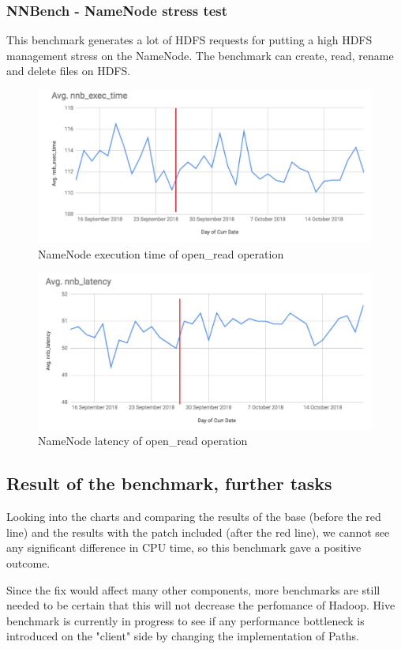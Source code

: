 \subsubsection{NNBench - NameNode stress test}
This benchmark generates a lot of HDFS requests for putting a high HDFS management stress on the NameNode. The benchmark can create, read, rename and delete files on HDFS.

\begin{figure}[H]
	\includegraphics[width=125mm, keepaspectratio]{figures/nn_exec.png}
	\centering
	\caption{NameNode execution time of open\_read operation}
\end{figure}
\begin{figure}[H]
	\includegraphics[width=125mm, keepaspectratio]{figures/nn_latency.png}
	\centering
	\caption{NameNode latency of open\_read operation}
\end{figure}

\subsection{Result of the benchmark, further tasks }
Looking into the charts and comparing the results of the base (before the red line) and the results with the patch included (after the red line), we cannot see any significant difference in CPU time, so this benchmark gave a positive outcome. 

Since the fix would affect many other components, more benchmarks are still needed to be certain that this will not decrease the perfomance of Hadoop. Hive benchmark is currently in progress to see if any performance bottleneck is introduced on the "client" side by changing the implementation of Paths.

